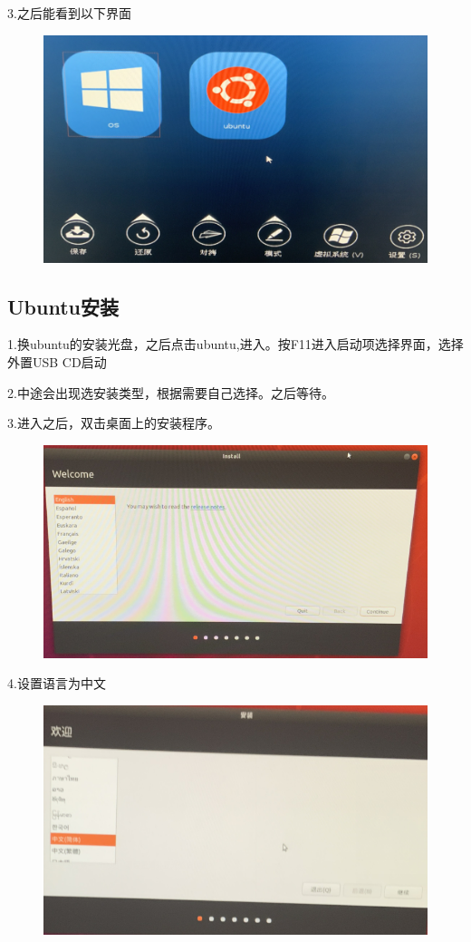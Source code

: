 \documentclass[openbib]{article}
\begin{document}
3.之后能看到以下界面
\begin{figure}[H]
	\centering
	\includegraphics[scale=0.3]{28}
\end{figure}
\subsection{Ubuntu安装}
1.换ubuntu的安装光盘，之后点击ubuntu,进入。按F11进入启动项选择界面，选择外置USB CD启动

2.中途会出现选安装类型，根据需要自己选择。之后等待。

3.进入之后，双击桌面上的安装程序。
\begin{figure}[H]
	\centering
	\includegraphics[scale=0.3]{29}
\end{figure}

4.设置语言为中文
\begin{figure}[H]
	\centering
	\includegraphics[scale=0.3]{30}
\end{figure}
\end{document}
